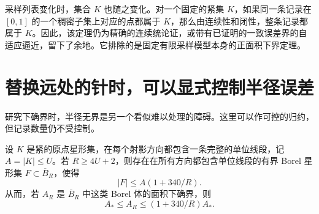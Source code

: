 采样列表变化时，集合 $K$ 也随之变化。对一个固定的紧集 $K$，如果同一条记录在 $[0,1]$ 的一个稠密子集上对应的点都属于 $K$，那么由连续性和闭性，整条记录都属于 $K$。因此，该定理仍为精确的连续统论证，或带有已证明的一致误差界的自适应逼近，留下了余地。它排除的是固定有限采样模型本身的正面积下界定理。

\section{替换远处的针时，可以显式控制半径误差}\label{sec:radius}
研究下确界时，半径无界是另一个看似难以处理的障碍。这里可以作可控的归约，但记录数量仍不受控制。

\begin{proposition}[半径截断]\label{prop:radius}
设 $K$ 是紧的原点星形集，在每个射影方向都包含一条完整的单位线段，记 $A=|K|\le U$。若 $R\ge4U+2$，则存在在所有方向都包含单位线段的有界 Borel 星形集 $F\subset\overline B_R$，使得
\[
 |F|\le A(1+340/R).
\]
从而，若 $A_R$ 是 $\overline B_R$ 中这类 Borel 体的面积下确界，则
\[
 A_*\le A_R\le(1+340/R)A_*.
\]
\end{proposition}

